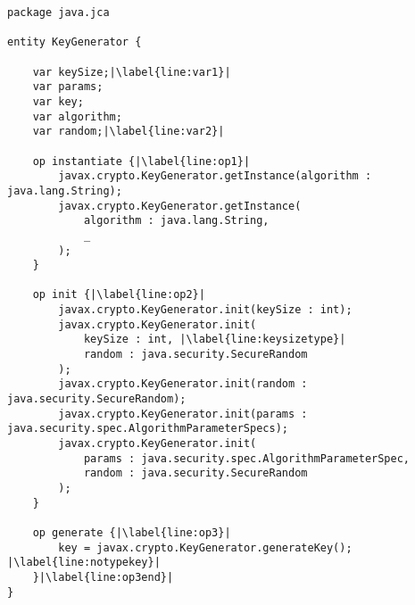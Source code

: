 \begin{lstlisting}[language=MARK,caption=  {Entity part of translated KeyGenerator \crysl{} rule to \MARK{} from JCA API.}, label={lst:keygenmarkentrans}, escapechar=|]
package java.jca

entity KeyGenerator {
    
    var keySize;|\label{line:var1}|
    var params;
    var key;
    var algorithm;
    var random;|\label{line:var2}|
    
    op instantiate {|\label{line:op1}|
        javax.crypto.KeyGenerator.getInstance(algorithm : java.lang.String);
        javax.crypto.KeyGenerator.getInstance(
            algorithm : java.lang.String,
            _
        );
    }
    
    op init {|\label{line:op2}|
        javax.crypto.KeyGenerator.init(keySize : int);
        javax.crypto.KeyGenerator.init(
            keySize : int, |\label{line:keysizetype}|
            random : java.security.SecureRandom
        );
        javax.crypto.KeyGenerator.init(random : java.security.SecureRandom);
        javax.crypto.KeyGenerator.init(params : java.security.spec.AlgorithmParameterSpecs);
        javax.crypto.KeyGenerator.init(
            params : java.security.spec.AlgorithmParameterSpec,
            random : java.security.SecureRandom
        );
    }
    
    op generate {|\label{line:op3}|
        key = javax.crypto.KeyGenerator.generateKey(); |\label{line:notypekey}|
    }|\label{line:op3end}|
}
\end{lstlisting}

